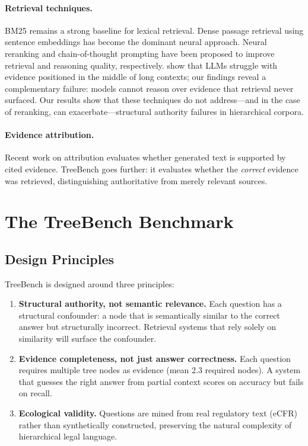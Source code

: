 \documentclass[11pt]{article}
\begin{document}
\paragraph{Retrieval techniques.} BM25 \citep{robertson2009bm25} remains a strong baseline for lexical retrieval. Dense passage retrieval \citep{karpukhin2020dense} using sentence embeddings \citep{reimers2019sentencebert, wang2020minilm} has become the dominant neural approach. Neural reranking \citep{nogueira2020reranking} and chain-of-thought prompting \citep{wei2022cot} have been proposed to improve retrieval and reasoning quality, respectively. \citet{liu2024lostmiddle} show that LLMs struggle with evidence positioned in the middle of long contexts; our findings reveal a complementary failure: models cannot reason over evidence that retrieval never surfaced. Our results show that these techniques do not address---and in the case of reranking, can exacerbate---structural authority failures in hierarchical corpora.

\paragraph{Evidence attribution.} Recent work on attribution \citep{rashkin2023attribution} evaluates whether generated text is supported by cited evidence. TreeBench goes further: it evaluates whether the \emph{correct} evidence was retrieved, distinguishing authoritative from merely relevant sources.


\section{The TreeBench Benchmark}
\label{sec:benchmark}

\subsection{Design Principles}

TreeBench is designed around three principles:

\begin{enumerate}[nosep]
    \item \textbf{Structural authority, not semantic relevance.} Each question has a structural confounder: a node that is semantically similar to the correct answer but structurally incorrect. Retrieval systems that rely solely on similarity will surface the confounder.
    \item \textbf{Evidence completeness, not just answer correctness.} Each question requires multiple tree nodes as evidence (mean 2.3 required nodes). A system that guesses the right answer from partial context scores on accuracy but fails on recall.
    \item \textbf{Ecological validity.} Questions are mined from real regulatory text (eCFR) rather than synthetically constructed, preserving the natural complexity of hierarchical legal language.
\end{enumerate}
\end{document}
